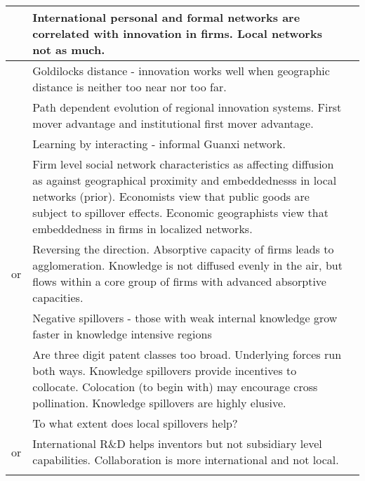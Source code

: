 \documentclass[12pt]{article}
\begin{document}
\begin{center}
\begin{longtable}{|p{}|p{}|p{}|}
\cite{Fitjar2015} & International personal and formal networks are correlated with innovation in firms. Local networks not as much. &\\\hline

\cite{Fitjar2016} & Goldilocks distance - innovation works well when geographic distance is neither too near nor too far.&\\\hline

\cite{Fu2012} & Path dependent evolution of regional innovation systems. First mover advantage and institutional first mover advantage.&\\\hline

\cite{Fu2013} & Learning by interacting - informal Guanxi network.&\\\hline

\cite{Giuliani2007} & Firm level social network characteristics as affecting diffusion as against geographical proximity and embeddednesss in local networks (prior). Economists view that public goods are subject to spillover effects. Economic geographists view that embeddedness in firms in localized networks.&\\\hline

\cite{Giuliani2005b} or \cite{Giuliani2005a} & Reversing the direction. Absorptive capacity of firms leads to agglomeration.  Knowledge is not diffused evenly in the air, but flows within a core group of firms with advanced absorptive capacities.&\\\hline

\cite{Grillitsch2017} & Negative spillovers - those with weak internal knowledge  grow faster in knowledge intensive regions&\\\hline

\cite{Henderson2005} & Are three digit patent classes too broad. Underlying forces run both ways. Knowledge spillovers provide incentives to collocate. Colocation (to begin with) may encourage cross pollination. Knowledge spillovers are highly elusive.&\\\hline

\cite{Huber2011} & To what extent does local spillovers help?&\\\hline

\cite{Alnuaimi2012a} or \cite{Alnuaimi2012b}& International R\&D helps inventors but not subsidiary level capabilities. Collaboration is more international and not local.&\\\hline

\cite{Jaffe1993}&&\\\hline


\end{longtable}
\end{center}
\end{document}
